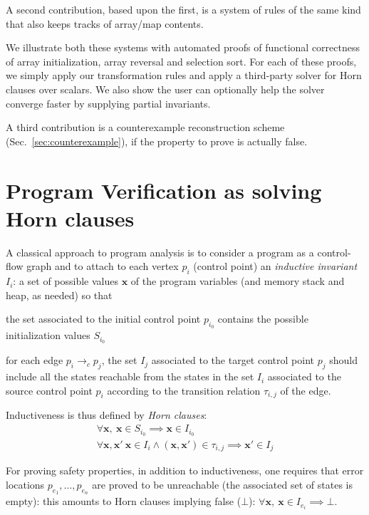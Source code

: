 \documentclass[a4paper]{article}
\newcommand{\ve}[1]{\mathbf{#1}}
\newcommand{\vx}{\ve{x}}
\theoremstyle{definition}
\theoremstyle{plain}
\begin{document}
A second contribution, based upon the first, is a system of rules of the same kind that also keeps tracks of array/map contents.

We illustrate both these systems with automated proofs of functional correctness of array initialization, array reversal and selection sort.
For each of these proofs, we simply apply our transformation rules and apply a third-party solver for Horn clauses over scalars.
We also show the user can optionally help the solver converge faster by supplying partial invariants.

A third contribution is a counterexample reconstruction scheme (Sec.~\ref{sec:counterexample}), if the property to prove is actually false.

\section{Program Verification as solving Horn clauses}
A classical approach to program analysis is to consider a program as a control-flow graph and to attach to each vertex $p_i$ (control point) an \emph{inductive invariant} $I_i$: a set of possible values $\vx$ of the program variables (and memory stack and heap, as needed) so that
\begin{inparaenum}[i)]
\item
the set associated to the initial control point $p_{i_0}$ contains the possible initialization values $S_{i_0}$
\item
for each edge $p_i \rightarrow_c p_j$, the set $I_j$ associated to the target control point $p_j$ should include all the states reachable from the states in the set $I_i$ associated to the source control point $p_i$ according to the transition relation $\tau_{i,j}$ of the edge.
\end{inparaenum}
Inductiveness is thus defined by \emph{Horn clauses}:
\begin{eqnarray}
\forall \vx,~ \vx \in S_{i_0} \implies \vx \in I_{i_0} \label{clause:init} \\
\forall \vx,\vx'~ \vx \in I_i \land (\vx,\vx') \in \tau_{i,j}
  \implies \vx' \in I_j \label{clause:inductive}
\end{eqnarray}

For proving safety properties, in addition to inductiveness, one requires that error locations $p_{e_1},\dots,p_{e_n}$ are proved to be unreachable (the associated set of states is empty): this amounts to Horn clauses implying false ($\bot$):
$\forall \vx,~ \vx \in I_{e_i} \implies \bot$.
\end{document}

